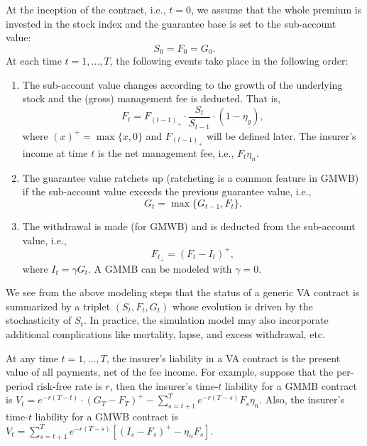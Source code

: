 \documentclass[]{article}
\begin{document}
At the inception of the contract, i.e., $t=0$, we assume that the whole premium is invested in the stock index and the guarantee base is set to the sub-account value:
\begin{equation*}
    S_0=F_0=G_0.
\end{equation*}
At each time $t=1,\ldots,T$, the following events take place in the following order:
\begin{enumerate}
    \item The sub-account value changes according to the growth of the underlying stock and the (gross) management fee is deducted. That is, 
        \begin{equation*}
            F_t = F_{(t-1)_+}\cdot\frac{S_{t}}{S_{t-1}}\cdot(1-\eta_g),
        \end{equation*} 
    where $(x)^+=\max\{x,0\}$ and $F_{(t-1)_+}$ will be defined later. The insurer's income at time $t$ is the net management fee, i.e., $F_t\eta_n$. 

    \item The guarantee value ratchets up (ratcheting is a common feature in GMWB) if the sub-account value exceeds the previous guarantee value, i.e., 
        \begin{equation*}
            G_t = \max\{G_{t-1},F_t\}.
        \end{equation*} 

    \item The withdrawal is made (for GMWB) and is deducted from the sub-account value, i.e., 
        \begin{equation*}
            F_{t_+} = (F_t - I_t)^+,
        \end{equation*} 
    where $I_t = \gamma G_t$. A GMMB can be modeled with $\gamma = 0$.
\end{enumerate}

We see from the above modeling steps that the status of a generic VA contract is summarized by a triplet $(S_t,F_t,G_t)$ whose evolution is driven by the stochasticity of $S_t$.
In practice, the simulation model may also incorporate additional complications like mortality, lapse, and excess withdrawal, etc.

At any time $t=1,\ldots,T$, the insurer's liability in a VA contract is the present value of all payments, net of the fee income.
For example, suppose that the per-period risk-free rate is $r$, then
the insurer's time-$t$ liability for a GMMB contract is $V_t = e^{-r(T-t)}\cdot (G_T - F_T)^+ - \sum_{s=t+1}^{T} e^{-r(T-s)} F_s \eta_n$.
Also, the insurer's time-$t$ liability for a GMWB contract is $V_t = \sum_{s=t+1}^{T} e^{-r(T-s)} [(I_s - F_s)^+- \eta_n F_s] $.
\end{document}
